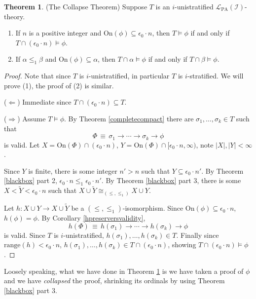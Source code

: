 \documentclass[reqno]{article}
\theoremstyle{definition}
\newtheorem{theorem}{Theorem}
\def\L{\mathscr{L}}
\def\LPA{\L_{\mathrm{PA}}}
\def\indset{\mathcal I}
\def\onset{\mathrm{On}}
\begin{document}
\begin{theorem}
\label{collapsetheorem}
(The Collapse Theorem)
Suppose $T$ is an $i$-unistratified $\LPA(\indset)$-theory.
\begin{enumerate}
\item If $n$ is a positive integer and $\onset(\phi)\subseteq\epsilon_0\cdot n$, then $T\models\phi$
if and only if $T\cap(\epsilon_0\cdot n)\models\phi$.
\item If $\alpha\leq_1\beta$ and $\onset(\phi)\subseteq\alpha$, then $T\cap\alpha\models\phi$
if and only if $T\cap\beta\models\phi$.
\end{enumerate}
\end{theorem}

\begin{proof}
Note that since $T$ is $i$-unistratified, in particular $T$ is $i$-stratified.
We will prove (1), the proof of (2) is similar.
\item
($\Leftarrow$) Immediate since $T\cap(\epsilon_0\cdot n)\subseteq T$.

\item
($\Rightarrow$)
Assume $T\models\phi$.
By Theorem \ref{completecompact} there are $\sigma_1,\ldots,\sigma_k\in T$
such that
\[
\Phi \,\equiv\, \sigma_1\rightarrow\cdots\rightarrow \sigma_k\rightarrow\phi
\]
is valid.
Let $X=\onset(\Phi)\cap(\epsilon_0\cdot n)$, $Y=\onset(\Phi)\cap[\epsilon_0\cdot n,\infty)$, note $|X|,|Y|<\infty$.

Since $Y$ is finite, there is some integer $n'>n$ such that $Y\subseteq\epsilon_0\cdot n'$.
By Theorem \ref{blackbox} part 2, $\epsilon_0\cdot n\leq_1\epsilon_0\cdot n'$.
By Theorem \ref{blackbox} part 3, there is some $X<\widetilde Y<\epsilon_0\cdot n$ such that
$X\cup\widetilde Y\cong_{(\leq,\leq_1)}X\cup Y$.

Let $h:X\cup Y\to X\cup\widetilde Y$ be a $(\leq,\leq_1)$-isomorphism.
Since $\onset(\phi)\subseteq\epsilon_0\cdot n$, $h(\phi)=\phi$.
By Corollary \ref{hpreserversvalidity},
\[
h(\Phi)\,\equiv\, h(\sigma_1)\rightarrow\cdots\rightarrow h(\sigma_k)\rightarrow \phi
\]
is valid.
Since $T$ is $i$-unistratified, $h(\sigma_1),\ldots,h(\sigma_k)\in T$.
Finally since $\mathrm{range}(h)<\epsilon_0\cdot n$, $h(\sigma_1),\ldots,h(\sigma_k)\in T\cap(\epsilon_0\cdot n)$,
showing $T\cap(\epsilon_0\cdot n)\models \phi$.
\end{proof}

Loosely speaking, what we have done in Theorem \ref{collapsetheorem} is we have
taken a proof of $\phi$ and we have \emph{collapsed} the proof, shrinking its ordinals
by using Theorem \ref{blackbox} part 3.
\end{document}
